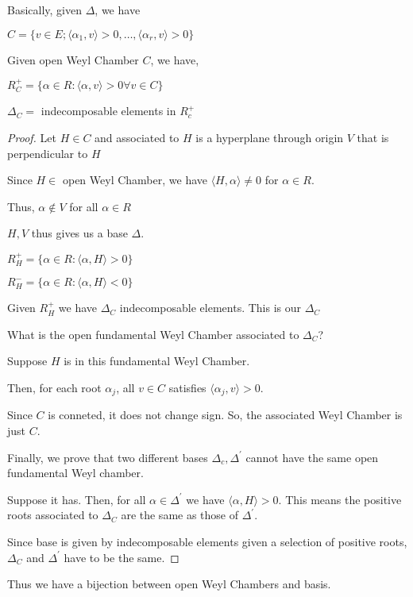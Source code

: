 \documentclass{article}
\theoremstyle{definition}
\begin{document}
Basically, given \(\Delta\), we have

\(C = \{ v\in E; \langle \alpha_1,v \rangle > 0, \dots , \langle \alpha_r,v \rangle > 0 \} \) 

Given open Weyl Chamber \(C\), we have,

\(R^+_C = \{ \alpha \in R : \langle \alpha ,v \rangle > 0 \forall v\in C \}\) 

\(\Delta_C = \) indecomposable elements in \(R_c^+\) 

\begin{proof}
    Let \(H\in C\) and associated to \(H\) is a hyperplane through origin \(V\) that is perpendicular to \(H\) 

    Since \(H\in\) open Weyl Chamber, we have \(\langle H,\alpha \rangle \neq 0\) for \(\alpha \in R\).

    Thus, \(\alpha\notin V\) for all \(\alpha \in R\) 

    \(H,V\) thus gives us a base \(\Delta\).

    \(R_H^+ = \{ \alpha \in R : \langle \alpha ,H \rangle > 0 \} \) 

    \(R_H^- = \{ \alpha \in R : \langle \alpha ,H \rangle < 0 \} \) 

    Given \(R_H^+\) we have \(\Delta_C\) indecomposable elements. This is our \(\Delta_C\) 

    What is the open fundamental Weyl Chamber associated to \(\Delta_C\)?

    Suppose \(H\) is in this fundamental Weyl Chamber.

    Then, for each root \(\alpha_j\), all \(v\in C\) satisfies \(\langle \alpha_j, v \rangle > 0\).

    Since \(C\) is conneted, it does not change sign. So, the associated Weyl Chamber is just \(C\).

    Finally, we prove that two different bases \(\Delta_c, \Delta ^{\prime} \) cannot have the same open fundamental Weyl chamber.

    Suppose it has. Then, for all \(\alpha \in \Delta^{\prime} \) we have \(\langle \alpha ,H \rangle > 0\). This means the positive roots associated to \(\Delta_C\) are the same as those of \(\Delta^{\prime} \).

    Since base is given by indecomposable elements given a selection of positive roots, \(\Delta_C\) and \(\Delta^{\prime} \) have to be the same.

\end{proof}

Thus we have a bijection between open Weyl Chambers and basis.
\end{document}
